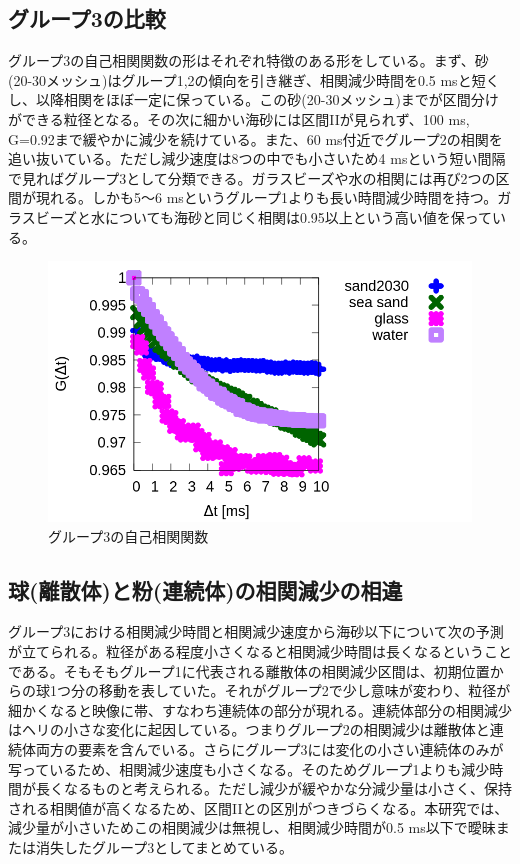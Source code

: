 \documentclass[a4j,12pt,dvipdfmx]{jsarticle}
\newcommand{\II}{I\hspace{-.1em}I}
\begin{document}
\subsection{グループ3の比較}
グループ3の自己相関関数の形はそれぞれ特徴のある形をしている。まず、砂(20-30メッシュ)はグループ1,2の傾向を引き継ぎ、相関減少時間を0.5 msと短くし、以降相関をほぼ一定に保っている。この砂(20-30メッシュ)までが区間分けができる粒径となる。その次に細かい海砂には区間\II が見られず、100 ms, G=0.92まで緩やかに減少を続けている。また、60 ms付近でグループ2の相関を追い抜いている。ただし減少速度は8つの中でも小さいため4 msという短い間隔で見ればグループ3として分類できる。ガラスビーズや水の相関には再び2つの区間が現れる。しかも5～6 msというグループ1よりも長い時間減少時間を持つ。ガラスビーズと水についても海砂と同じく相関は0.95以上という高い値を保っている。
\begin{figure}[H]
	\includegraphics[scale=0.4]{three_up.png}
	\caption{グループ3の自己相関関数}
	\label{fig:three}
\end{figure}
\subsection{球(離散体)と粉(連続体)の相関減少の相違}
グループ3における相関減少時間と相関減少速度から海砂以下について次の予測が立てられる。粒径がある程度小さくなると相関減少時間は長くなるということである。そもそもグループ1に代表される離散体の相関減少区間は、初期位置からの球1つ分の移動を表していた。それがグループ2で少し意味が変わり、粒径が細かくなると映像に帯、すなわち連続体の部分が現れる。連続体部分の相関減少はヘリの小さな変化に起因している。つまりグループ2の相関減少は離散体と連続体両方の要素を含んでいる。さらにグループ3には変化の小さい連続体のみが写っているため、相関減少速度も小さくなる。そのためグループ1よりも減少時間が長くなるものと考えられる。ただし減少が緩やかな分減少量は小さく、保持される相関値が高くなるため、区間\II との区別がつきづらくなる。本研究では、減少量が小さいためこの相関減少は無視し、相関減少時間が0.5 ms以下で曖昧または消失したグループ3としてまとめている。
\end{document}
